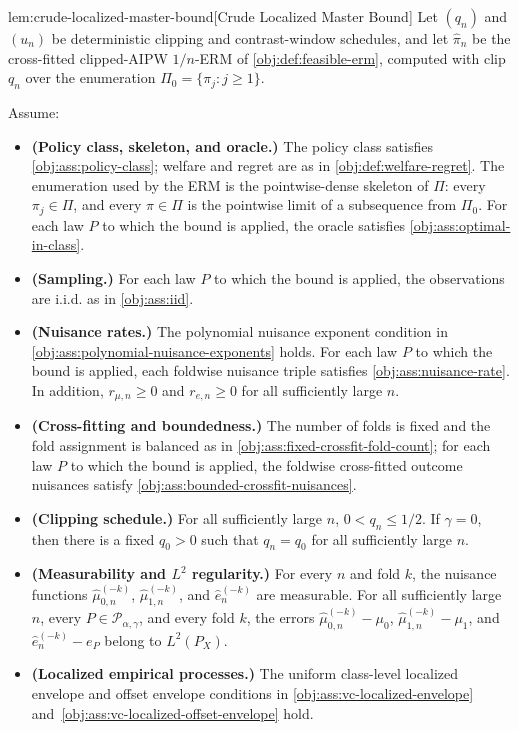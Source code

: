 \documentclass[11pt]{article}
\begin{document}
\begin{lemmav}{lem:crude-localized-master-bound}[Crude Localized Master Bound]
Let \((q_n)\) and \((u_n)\) be deterministic clipping and contrast-window schedules, and let \(\widehat\pi_n\) be the cross-fitted clipped-AIPW \(1/n\)-ERM of \cref{obj:def:feasible-erm}, computed with clip \(q_n\) over the enumeration \(\Pi_0=\{\pi_j:j\ge1\}\).

Assume:
\begin{itemize}
\item \textbf{(Policy class, skeleton, and oracle.)} The policy class satisfies \cref{obj:ass:policy-class}; welfare and regret are as in \cref{obj:def:welfare-regret}. The enumeration used by the ERM is the pointwise-dense skeleton of \(\Pi\): every \(\pi_j\in\Pi\), and every \(\pi\in\Pi\) is the pointwise limit of a subsequence from \(\Pi_0\). For each law \(P\) to which the bound is applied, the oracle satisfies \cref{obj:ass:optimal-in-class}.
\item \textbf{(Sampling.)} For each law \(P\) to which the bound is applied, the observations are i.i.d. as in \cref{obj:ass:iid}.
\item \textbf{(Nuisance rates.)} The polynomial nuisance exponent condition in \cref{obj:ass:polynomial-nuisance-exponents} holds. For each law \(P\) to which the bound is applied, each foldwise nuisance triple satisfies \cref{obj:ass:nuisance-rate}. In addition, \(r_{\mu,n}\ge0\) and \(r_{e,n}\ge0\) for all sufficiently large \(n\).
\item \textbf{(Cross-fitting and boundedness.)} The number of folds is fixed and the fold assignment is balanced as in \cref{obj:ass:fixed-crossfit-fold-count}; for each law \(P\) to which the bound is applied, the foldwise cross-fitted outcome nuisances satisfy \cref{obj:ass:bounded-crossfit-nuisances}.
\item \textbf{(Clipping schedule.)} For all sufficiently large \(n\), \(0<q_n\le 1/2\). If \(\gamma=0\), then there is a fixed \(q_0>0\) such that \(q_n=q_0\) for all sufficiently large \(n\).
\item \textbf{(Measurability and \(L^2\) regularity.)} For every \(n\) and fold \(k\), the nuisance functions \(\widehat\mu_{0,n}^{(-k)}\), \(\widehat\mu_{1,n}^{(-k)}\), and \(\widehat e_n^{(-k)}\) are measurable. For all sufficiently large \(n\), every \(P\in\mathcal P_{\alpha,\gamma}\), and every fold \(k\), the errors \(\widehat\mu_{0,n}^{(-k)}-\mu_0\), \(\widehat\mu_{1,n}^{(-k)}-\mu_1\), and \(\widehat e_n^{(-k)}-e_P\) belong to \(L^2(P_X)\).
\item \textbf{(Localized empirical processes.)} The uniform class-level localized envelope and offset envelope conditions in \cref{obj:ass:vc-localized-envelope} and~\cref{obj:ass:vc-localized-offset-envelope} hold.
\end{itemize}


\end{lemmav}
\end{document}
